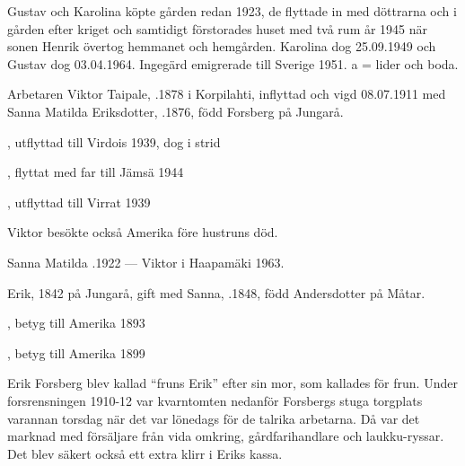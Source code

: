 Gustav och Karolina köpte gården redan 1923, de flyttade in med döttrarna  och  i gården efter kriget och samtidigt förstorades huset med två rum år 1945 när sonen Henrik övertog hemmanet och hemgården. Karolina dog 25.09.1949 och Gustav dog 03.04.1964. Ingegärd emigrerade till Sverige 1951.  a = lider och 	boda.


Arbetaren Viktor Taipale, .1878 i Korpilahti, inflyttad och vigd 08.07.1911 med Sanna Matilda Eriksdotter, .1876, född Forsberg på Jungarå.
\begin{jhchildren}
  \item {}, utflyttad till Virdois 1939, dog i strid
  \item {}
  \item {}, flyttat med far till Jämsä 1944
  \item {}
  \item {}, utflyttad till Virrat 1939
\end{jhchildren}
Viktor besökte också Amerika före hustruns död.

Sanna Matilda .1922  ---  Viktor \textdied i  Haapamäki 1963.


Erik,  1842 på Jungarå, gift med Sanna, .1848, född Andersdotter på Måtar.
\begin{jhchildren}
  \item {}
  \item {}, betyg till Amerika 1893
  \item {}
  \item {}
  \item {}, betyg till Amerika 1899
  \item {}
\end{jhchildren}
Erik Forsberg blev kallad ``fruns Erik'' efter sin mor, som kallades för frun. Under forsrensningen 1910-12 var kvarntomten nedanför Forsbergs stuga torgplats varannan torsdag när det var lönedags för de talrika arbetarna. Då var det marknad med försäljare från vida omkring, gårdfarihandlare och laukku-ryssar. Det blev säkert också ett extra klirr i Eriks kassa.

